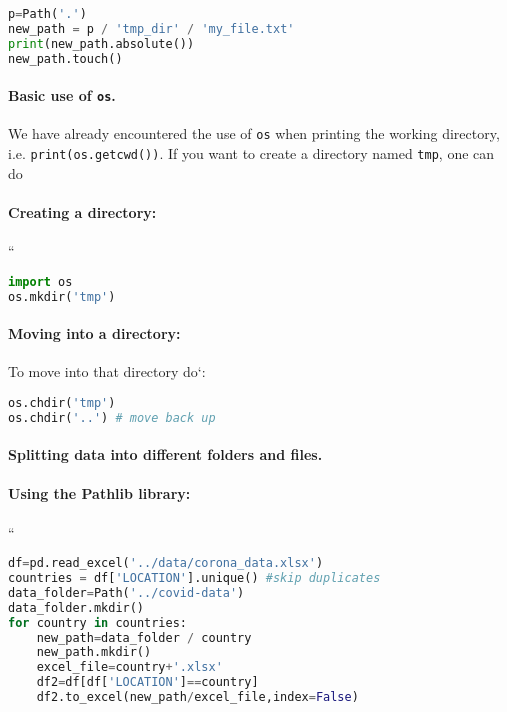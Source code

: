 \documentclass[graybox,sectrefs,envcountresetchap,open=right,final]{svmonodo}
\begin{document}
\begin{lstlisting}[language=python,style=blue1bar]
p=Path('.')
new_path = p / 'tmp_dir' / 'my_file.txt'
print(new_path.absolute())
new_path.touch()

\end{lstlisting}


\paragraph{Basic use of \texttt{os}.}
We have already encountered the use of \texttt{os} when printing the working directory, i.e. \texttt{print(os.getcwd())}. If you want to create a directory named \texttt{tmp}, one can do

\paragraph{Creating a directory:}
``



\begin{lstlisting}[language=python,style=blue1bar]
import os
os.mkdir('tmp')

\end{lstlisting}

\paragraph{Moving into a directory:}

To move into that directory do`:



\begin{lstlisting}[language=python,style=blue1bar]
os.chdir('tmp')
os.chdir('..') # move back up

\end{lstlisting}


\paragraph{Splitting data into different folders and files.}
\paragraph{Using the Pathlib library:}
``











\begin{lstlisting}[language=python,style=blue1bar]
df=pd.read_excel('../data/corona_data.xlsx')
countries = df['LOCATION'].unique() #skip duplicates
data_folder=Path('../covid-data')
data_folder.mkdir()
for country in countries:
    new_path=data_folder / country
    new_path.mkdir()
    excel_file=country+'.xlsx'
    df2=df[df['LOCATION']==country]
    df2.to_excel(new_path/excel_file,index=False)

\end{lstlisting}
\end{document}
